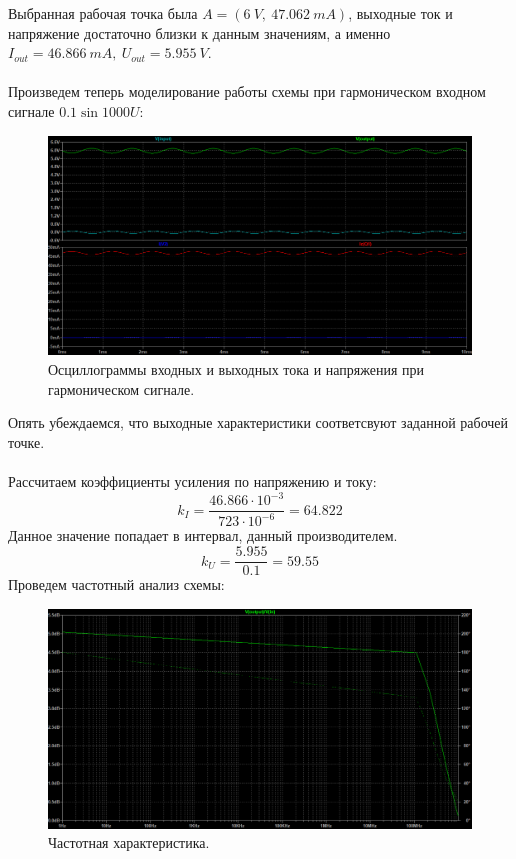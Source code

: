 \documentclass[12pt]{article}
\begin{document}
Выбранная рабочая точка была $A = (6 \ V, \ 47.062 \ mA)$, выходные ток и напряжение достаточно близки к данным значениям, а именно $I_{out} = 46.866 \ mA, \ U_{out} =  5.955 \ V.$ \\
\ \\
Произведем теперь моделирование работы схемы при гармоническом входном сигнале $0.1 \sin{1000 U}$:
\begin{figure}[H]
    \centering
    \includegraphics[width=\textwidth]{3_sin_i_v.png}
    \caption{Осциллограммы входных и выходных тока и напряжения при гармоническом сигнале.}
    \label{fig:3_sin_i_v.png}
\end{figure}
Опять убеждаемся, что выходные характеристики соответсвуют заданной рабочей точке.\\
\ \\
Рассчитаем коэффициенты усиления по напряжению и току:
\[
k_I = \frac{46.866 \cdot 10^{-3}}{723 \cdot 10^{-6}} = 64.822
\]
Данное значение попадает в интервал, данный производителем.
\[
k_U = \frac{5.955}{0.1} = 59.55
\]
Проведем частотный анализ схемы:
\begin{figure}[H]
    \centering
    \includegraphics[width=\textwidth]{3_freq_char.png}
    \caption{Частотная характеристика.}
    \label{fig:3_freq_char.png}
\end{figure}
\end{document}
